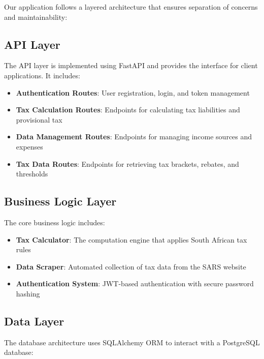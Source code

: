\documentclass[
  11pt,
  letterpaper,
]{article}
\providecommand{\tightlist}{%
  \setlength{\itemsep}{0pt}\setlength{\parskip}{0pt}}\usepackage{longtable,booktabs,array}
\begin{document}
Our application follows a layered architecture that ensures separation
of concerns and maintainability:

\hypertarget{api-layer}{%
\subsection{API Layer}\label{api-layer}}

The API layer is implemented using FastAPI and provides the interface
for client applications. It includes:

\begin{itemize}
\tightlist
\item
  \textbf{Authentication Routes}: User registration, login, and token
  management
\item
  \textbf{Tax Calculation Routes}: Endpoints for calculating tax
  liabilities and provisional tax
\item
  \textbf{Data Management Routes}: Endpoints for managing income sources
  and expenses
\item
  \textbf{Tax Data Routes}: Endpoints for retrieving tax brackets,
  rebates, and thresholds
\end{itemize}

\hypertarget{business-logic-layer}{%
\subsection{Business Logic Layer}\label{business-logic-layer}}

The core business logic includes:

\begin{itemize}
\tightlist
\item
  \textbf{Tax Calculator}: The computation engine that applies South
  African tax rules
\item
  \textbf{Data Scraper}: Automated collection of tax data from the SARS
  website
\item
  \textbf{Authentication System}: JWT-based authentication with secure
  password hashing
\end{itemize}

\hypertarget{data-layer}{%
\subsection{Data Layer}\label{data-layer}}

The database architecture uses SQLAlchemy ORM to interact with a
PostgreSQL database:
\end{document}

